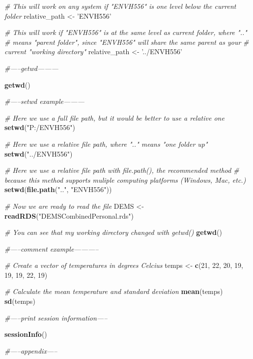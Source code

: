 \documentclass[
]{article}
\newenvironment{Shaded}{\begin{snugshade}}{\end{snugshade}}
\newcommand{\CommentTok}[1]{\textcolor[rgb]{0.56,0.35,0.01}{\textit{#1}}}
\newcommand{\DecValTok}[1]{\textcolor[rgb]{0.00,0.00,0.81}{#1}}
\newcommand{\KeywordTok}[1]{\textcolor[rgb]{0.13,0.29,0.53}{\textbf{#1}}}
\newcommand{\NormalTok}[1]{#1}
\newcommand{\StringTok}[1]{\textcolor[rgb]{0.31,0.60,0.02}{#1}}
\begin{document}
\begin{Shaded}
\begin{Highlighting}[]
\CommentTok{# This will work on any system if "ENVH556" is one level below the current folder}
\NormalTok{relative_path <-}\StringTok{ 'ENVH556'}

\CommentTok{# This will work if "ENVH556" is at the same level as current folder, where ".."}
\CommentTok{# means "parent folder", since "ENVH556" will share the same parent as your }
\CommentTok{# current "working directory"}
\NormalTok{relative_path <-}\StringTok{ '../ENVH556'}

\CommentTok{#-----getwd---------}

\KeywordTok{getwd}\NormalTok{()}

\CommentTok{#-----setwd example---------}

\CommentTok{# Here we use a full file path, but it would be better to use a relative one}
\KeywordTok{setwd}\NormalTok{(}\StringTok{"P:/ENVH556"}\NormalTok{)}

\CommentTok{# Here we use a relative file path, where ".." means "one folder up"}
\KeywordTok{setwd}\NormalTok{(}\StringTok{"../ENVH556"}\NormalTok{)}

\CommentTok{# Here we use a relative file path with file.path(), the recommended method}
\CommentTok{# because this method supports muliple computing platforms (Windows, Mac, etc.)}
\KeywordTok{setwd}\NormalTok{(}\KeywordTok{file.path}\NormalTok{(}\StringTok{".."}\NormalTok{, }\StringTok{"ENVH556"}\NormalTok{))}

\CommentTok{# Now we are ready to read the file}
\NormalTok{DEMS <-}\StringTok{ }\KeywordTok{readRDS}\NormalTok{(}\StringTok{"DEMSCombinedPersonal.rds"}\NormalTok{)}

\CommentTok{# You can see that my working directory changed with getwd()}
\KeywordTok{getwd}\NormalTok{()}

\CommentTok{#-----comment example-----------}

\CommentTok{# Create a vector of temperatures in degrees Celcius}
\NormalTok{temps <-}\StringTok{ }\KeywordTok{c}\NormalTok{(}\DecValTok{21}\NormalTok{, }\DecValTok{22}\NormalTok{, }\DecValTok{20}\NormalTok{, }\DecValTok{19}\NormalTok{, }\DecValTok{19}\NormalTok{, }\DecValTok{19}\NormalTok{, }\DecValTok{22}\NormalTok{, }\DecValTok{19}\NormalTok{)}

\CommentTok{# Calculate the mean temperature and standard deviation}
\KeywordTok{mean}\NormalTok{(temps)}
\KeywordTok{sd}\NormalTok{(temps)}

\CommentTok{#-----print session information-----}

\KeywordTok{sessionInfo}\NormalTok{()}

\CommentTok{#-----appendix-----}
\end{Highlighting}
\end{Shaded}
\end{document}
